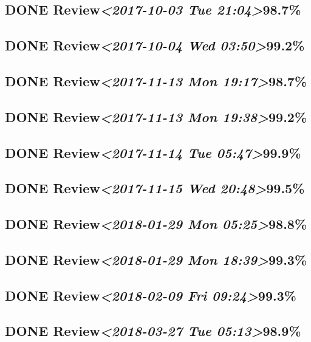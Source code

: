 \documentclass[11pt]{ctexart}
\begin{document}
\subsection{{\bfseries\sffamily DONE} Review\textit{<2017-10-03 Tue 21:04>}98.7\%}
\label{sec:org3431381}
\subsection{{\bfseries\sffamily DONE} Review\textit{<2017-10-04 Wed 03:50>}99.2\%}
\label{sec:orgf1b9611}

\subsection{{\bfseries\sffamily DONE} Review\textit{<2017-11-13 Mon 19:17>}98.7\%}
\label{sec:orgb85e85b}
\subsection{{\bfseries\sffamily DONE} Review\textit{<2017-11-13 Mon 19:38>}99.2\%}
\label{sec:org8a80888}
\subsection{{\bfseries\sffamily DONE} Review\textit{<2017-11-14 Tue 05:47>}99.9\%}
\label{sec:org84816c0}
\subsection{{\bfseries\sffamily DONE} Review\textit{<2017-11-15 Wed 20:48>}99.5\%}
\label{sec:orge031ff2}
\subsection{{\bfseries\sffamily DONE} Review\textit{<2018-01-29 Mon 05:25>}98.8\%}
\label{sec:org57d3334}
\subsection{{\bfseries\sffamily DONE} Review\textit{<2018-01-29 Mon 18:39>}99.3\%}
\label{sec:orgf22f2b6}
\subsection{{\bfseries\sffamily DONE} Review\textit{<2018-02-09 Fri 09:24>}99.3\%}
\label{sec:org71d7000}
\subsection{{\bfseries\sffamily DONE} Review\textit{<2018-03-27 Tue 05:13>}98.9\%}
\label{sec:org6ec030d}
\end{document}
